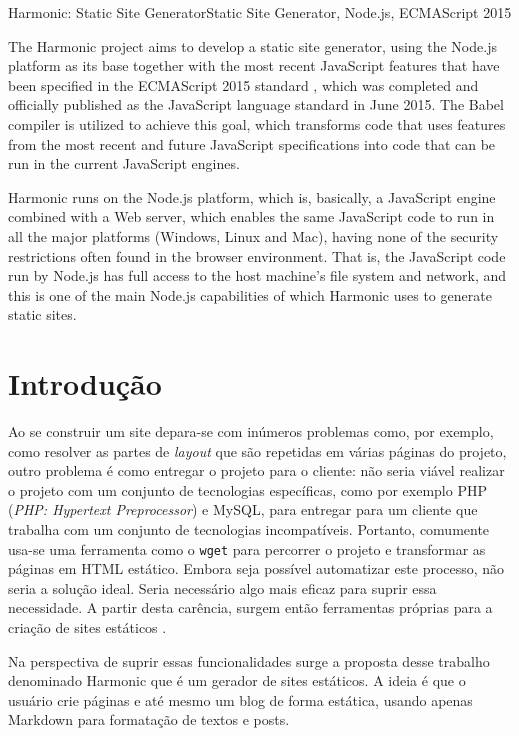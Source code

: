 \documentclass[ppginf, pep]{esinucpel}
\newcommand{\code}[1]{\texttt{#1}}
\begin{document}
\begin{englishabstract}{Harmonic: Static Site Generator}{Static Site Generator, Node.js, ECMAScript 2015}

The Harmonic project aims to develop a static site generator, using the Node.js platform as its base together with the most recent JavaScript features that have been specified in the ECMAScript 2015 standard \cite{es2015}, which was completed and officially published as the JavaScript language standard in June 2015. The Babel compiler is utilized to achieve this goal, which transforms code that uses features from the most recent and future JavaScript specifications into code that can be run in the current JavaScript engines.

Harmonic runs on the Node.js platform, which is, basically, a JavaScript engine combined with a Web server, which enables the same JavaScript code to run in all the major platforms (Windows, Linux and Mac), having none of the security restrictions often found in the browser environment. That is, the JavaScript code run by Node.js has full access to the host machine's file system and network, and this is one of the main Node.js capabilities of which Harmonic uses to generate static sites.

\end{englishabstract}

\chapter{Introdução}

Ao se construir um site depara-se com inúmeros problemas como, por exemplo, como resolver as partes de \textit{layout} que são repetidas em várias páginas do projeto, outro problema é como entregar o projeto para o cliente: não seria viável realizar o projeto com um conjunto de tecnologias específicas, como por exemplo PHP (\textit{PHP: Hypertext Preprocessor}) e MySQL, para entregar para um cliente que trabalha com um conjunto de tecnologias incompatíveis.
Portanto, comumente usa-se uma ferramenta como o \code{wget} para percorrer o projeto e transformar as páginas em HTML estático. Embora seja possível automatizar este processo, não seria a solução ideal. Seria necessário algo mais eficaz para suprir essa necessidade. A partir desta carência, surgem então ferramentas próprias para a criação de sites estáticos \cite{tableless}.


Na perspectiva de suprir essas funcionalidades surge a proposta desse trabalho  denominado Harmonic que é um gerador de sites estáticos. A ideia é que o usuário crie páginas e até mesmo um blog de forma estática, usando apenas  Markdown para formatação de textos e posts. 
\end{document}
